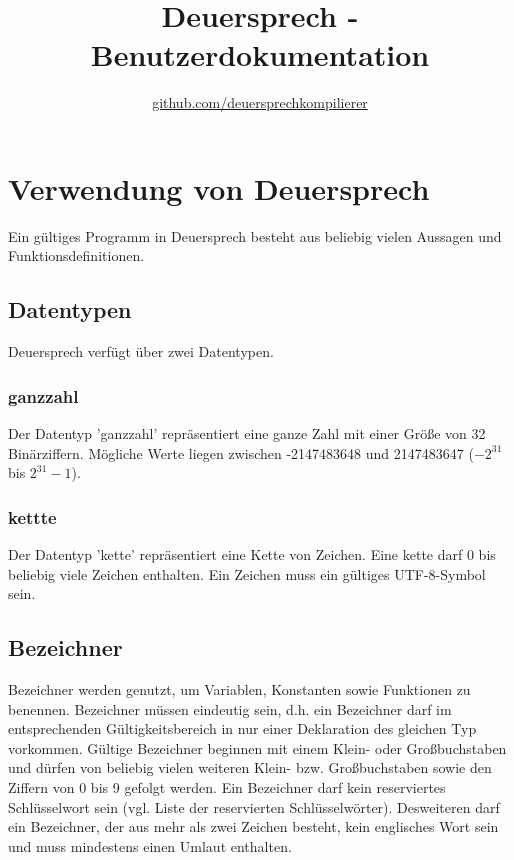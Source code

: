 \documentclass[12pt, a4paper, oneside, ngerman]{article}
\title{Deuersprech - Benutzerdokumentation}
\begin{document}
 
\author{\href{https://github.com/deuersprechkompilierer}{github.com/deuersprechkompilierer}}

\maketitle
\thispagestyle{empty}
\pagebreak
\tableofcontents
\newpage
 


\section{Verwendung von Deuersprech}
Ein gültiges Programm in Deuersprech besteht aus beliebig vielen Aussagen und Funktionsdefinitionen. 

\subsection{Datentypen}
Deuersprech verfügt über zwei Datentypen.

\subsubsection{ganzzahl}
Der Datentyp 'ganzzahl' repräsentiert eine ganze Zahl mit einer Größe von 32 Binärziffern. Mögliche Werte liegen zwischen -2147483648 und 2147483647 ($-2^{31}$ bis $2^{31} - 1$).

\subsubsection{kettte}
Der Datentyp 'kette' repräsentiert eine Kette von Zeichen. Eine kette darf 0 bis beliebig viele Zeichen enthalten. Ein Zeichen muss ein gültiges UTF-8-Symbol sein.


\subsection{Bezeichner}
Bezeichner werden genutzt, um Variablen, Konstanten sowie Funktionen zu benennen.
Bezeichner müssen eindeutig sein, d.h. ein Bezeichner darf im entsprechenden Gültigkeitsbereich in nur einer Deklaration des gleichen Typ vorkommen. 
Gültige Bezeichner beginnen mit einem Klein- oder Großbuchstaben und dürfen von beliebig vielen weiteren Klein- bzw. Großbuchstaben sowie den Ziffern von 0 bis 9 gefolgt werden. 
Ein Bezeichner darf kein reserviertes Schlüsselwort sein (vgl. Liste der reservierten Schlüsselwörter).
Desweiteren darf ein Bezeichner, der aus mehr als zwei Zeichen besteht, kein englisches Wort sein und muss mindestens einen Umlaut enthalten.
\end{document}
